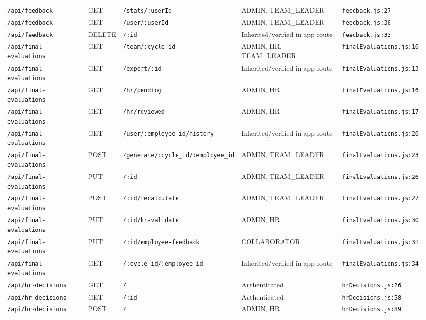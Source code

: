 \begin{landscape}
\begin{longtable}{p{}p{}p{}p{}p{}}
\texttt{/api/feedback} & GET & \texttt{/stats/:userId} & ADMIN,  TEAM\_LEADER & \texttt{feedback.js:27}\\
\texttt{/api/feedback} & GET & \texttt{/user/:userId} & ADMIN,  TEAM\_LEADER & \texttt{feedback.js:30}\\
\texttt{/api/feedback} & DELETE & \texttt{/:id} & Inherited/verified in app route & \texttt{feedback.js:33}\\
\texttt{/api/final-evaluations} & GET & \texttt{/team/:cycle\_id} & ADMIN,  HR,  TEAM\_LEADER & \texttt{finalEvaluations.js:10}\\
\texttt{/api/final-evaluations} & GET & \texttt{/export/:id} & Inherited/verified in app route & \texttt{finalEvaluations.js:13}\\
\texttt{/api/final-evaluations} & GET & \texttt{/hr/pending} & ADMIN,  HR & \texttt{finalEvaluations.js:16}\\
\texttt{/api/final-evaluations} & GET & \texttt{/hr/reviewed} & ADMIN,  HR & \texttt{finalEvaluations.js:17}\\
\texttt{/api/final-evaluations} & GET & \texttt{/user/:employee\_id/history} & Inherited/verified in app route & \texttt{finalEvaluations.js:20}\\
\texttt{/api/final-evaluations} & POST & \texttt{/generate/:cycle\_id/:employee\_id} & ADMIN,  TEAM\_LEADER & \texttt{finalEvaluations.js:23}\\
\texttt{/api/final-evaluations} & PUT & \texttt{/:id} & ADMIN,  TEAM\_LEADER & \texttt{finalEvaluations.js:26}\\
\texttt{/api/final-evaluations} & POST & \texttt{/:id/recalculate} & ADMIN,  TEAM\_LEADER & \texttt{finalEvaluations.js:27}\\
\texttt{/api/final-evaluations} & PUT & \texttt{/:id/hr-validate} & ADMIN,  HR & \texttt{finalEvaluations.js:30}\\
\texttt{/api/final-evaluations} & PUT & \texttt{/:id/employee-feedback} & COLLABORATOR & \texttt{finalEvaluations.js:31}\\
\texttt{/api/final-evaluations} & GET & \texttt{/:cycle\_id/:employee\_id} & Inherited/verified in app route & \texttt{finalEvaluations.js:34}\\
\texttt{/api/hr-decisions} & GET & \texttt{/} & Authenticated & \texttt{hrDecisions.js:26}\\
\texttt{/api/hr-decisions} & GET & \texttt{/:id} & Authenticated & \texttt{hrDecisions.js:58}\\
\texttt{/api/hr-decisions} & POST & \texttt{/} & ADMIN,  HR & \texttt{hrDecisions.js:89}\\

\end{longtable}
\end{landscape}
